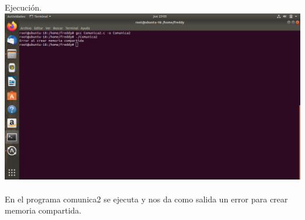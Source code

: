 \documentclass[11pt,a4paper]{report}
\begin{document}
Ejecuci\'on.\\
\includegraphics[scale=.35]{Comunica2.png} 
\\
\\
En el programa comunica2 se ejecuta y nos da como salida un error para crear memoria compartida.
\clearpage
\end{document}
